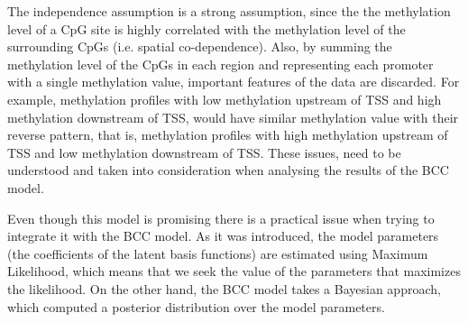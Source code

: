 The independence assumption is a strong assumption, since the the methylation level of a CpG site is highly correlated with the methylation level of the surrounding CpGs (i.e. spatial co-dependence). Also, by summing the methylation level of the CpGs in each region and representing each promoter with a single methylation value, important features of the data are discarded. For example, methylation profiles with low methylation upstream of TSS and high methylation downstream of TSS, would have similar methylation value with their reverse pattern, that is, methylation profiles with high methylation upstream of TSS and low methylation downstream of TSS. These issues, need to be understood and taken into consideration when analysing the results of the BCC model.



Even though this model is promising there is a practical issue when trying to integrate it with the BCC model. As it was introduced, the model parameters (\ie the coefficients of the latent basis functions) are estimated using Maximum Likelihood, which means that we seek the value of the parameters that maximizes the likelihood. On the other hand, the BCC model takes a Bayesian approach, which computed a posterior distribution over the model parameters. 